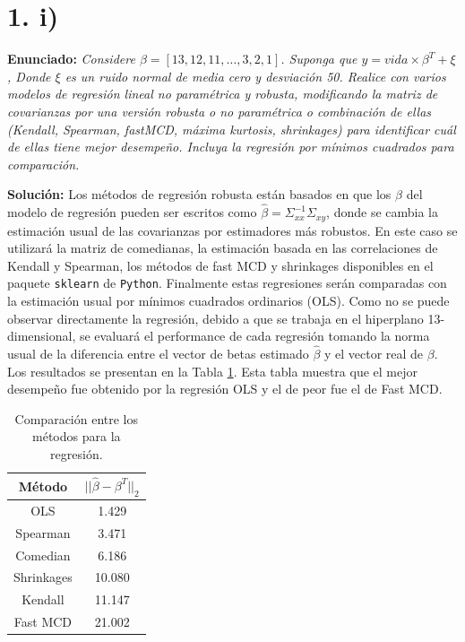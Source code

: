 \documentclass[fleqn]{article}
\begin{document}
\section*{1. i)}
\textbf{Enunciado:} \textit{ Considere $\beta = [13, 12, 11,\hdots, 3, 2, 1]$. Suponga que $y=vida\times \beta^T + \xi$, Donde $\xi$ es un ruido normal de media cero y desviación 50. Realice con varios modelos de regresión lineal no paramétrica y robusta, modificando la matriz de covarianzas por una versión robusta o no paramétrica o combinación de ellas (Kendall, Spearman, fastMCD, máxima kurtosis, shrinkages) para identificar cuál de ellas tiene mejor desempeño. Incluya la regresión por mínimos cuadrados para comparación.}


\textbf{Solución:} Los métodos de regresión robusta están basados en que los $\beta$ del modelo de regresión pueden ser escritos como $\hat{\beta}=\Sigma_{xx}^{-1}\Sigma_{xy}$, donde se cambia la estimación usual de las covarianzas por estimadores más robustos. En este caso se utilizará la matriz de comedianas, la estimación basada en las correlaciones de Kendall y Spearman, los métodos de fast MCD y shrinkages disponibles en el paquete \texttt{sklearn} de \texttt{Python}. Finalmente estas regresiones serán comparadas con la estimación usual por mínimos cuadrados ordinarios (OLS). Como no se puede observar directamente la regresión, debido a que se trabaja en el hiperplano 13-dimensional, se evaluará el performance de cada regresión tomando la norma usual de la diferencia entre el vector de betas estimado $\hat{\beta}$ y el vector real de $\beta$. Los resultados se presentan en la Tabla \ref{tab:meth}. Esta tabla muestra que el mejor desempeño fue obtenido por la regresión OLS y el de peor fue el de Fast MCD.

\begin{table}[H]
\centering
\begin{tabular}{cc}
\hline
\textbf{Método} & \textbf{$||\hat{\beta}-\beta^T||_2$} \\ \hline
OLS             & 1.429                                           \\
Spearman        & 3.471                                           \\
Comedian        & 6.186                                           \\
Shrinkages      & 10.080                                          \\
Kendall         & 11.147                                          \\
Fast MCD        & 21.002                                          \\ \hline
\end{tabular}
\caption{Comparación entre los métodos para la regresión.}
\label{tab:meth}
\end{table}




\end{document}
